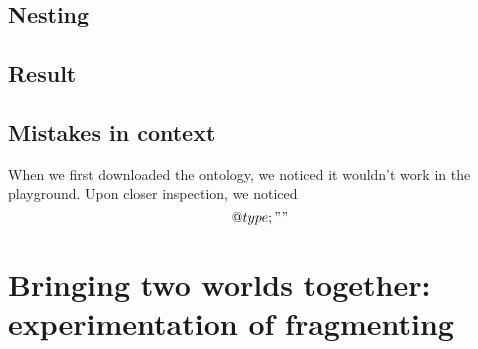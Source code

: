 \subsection{Nesting}
\subsection{Result}
\subsection{Mistakes in context}
When we first downloaded the ontology, we noticed it wouldn't work in the  playground. Upon closer inspection, we noticed 
$$@type; ""$$
\section{Bringing two worlds together: experimentation of fragmenting}
